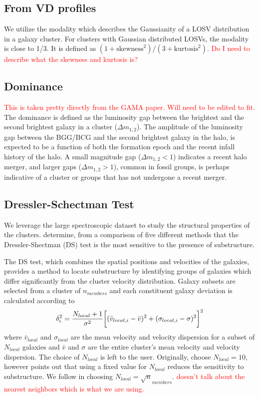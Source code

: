 \documentclass[apj, revtex4]{emulateapj}
\newcommand{\editorial}[1]{\textcolor{red}{#1} }
\begin{document}
\subsection{From VD profiles}
We utilize the modality \citep{Oliva-Altamirano2014} which describes the Gaussianity of a LOSV distribution in a galaxy cluster. For clusters with Gaussian distributed LOSVs, the modality is close to 1/3. It is defined as $(1+\mathrm{skewness}^2)/(3+\mathrm{kurtosis}^2)$. \editorial{Do I need to describe what the skewness and kurtosis is?}

\subsection{Dominance}
\editorial{This is taken pretty directly from the GAMA paper. Will need to be edited to fit.}
The dominance is defined as the luminosity gap between the brightest and the second brightest galaxy in a cluster ($\Delta m_{1, 2}$). The amplitude of the luminosity gap between the BGG/BCG and the second brightest galaxy in the halo, is expected to be a function of both the formation epoch and the recent infall history of the halo. A small magnitude gap ($\Delta m_{1, 2} < 1$) indicates a recent halo merger, and larger gaps ($\Delta m_{1, 2} > 1$), common in fossil groups, is perhaps indicative of a cluster or groups that has not undergone a recent merger.

\subsection{Dressler-Schectman Test}
We leverage the large spectroscopic dataset to study the structural properties of the clusters. \cite{Pinkney1996} determine, from a comparison of five different methods that the Dressler-Shectman (DS) test \citep{Dressler1988} is the most sensitive to the presence of substructure.

The DS test, which combines the spatial positions and velocities of the galaxies, provides a method to locate substructure by identifying groups of galaxies which differ significantly from the cluster velocity distribution. Galaxy subsets are selected from a cluster of $n_{members}$ and each constituent galaxy deviation is calculated according to
\begin{equation}
	\delta_i^2 = \frac{N_{local}+1}{\sigma^2}\bigg{[}(\bar{v}_{local,i} - \bar{v})^2 + (\sigma_{local,i} - \sigma)^2\bigg{]}^2
\end{equation}
where $\bar{v}_{local}$ and $\sigma_{local}$ are the mean velocity and velocity dispersion for a subset of $N_{local}$ galaxies and $\bar{v}$ and $\sigma$ are the entire cluster's mean velocity and velocity dispersion. The choice of $N_{local}$ is left to the user. Originally, \cite{Dressler1988} choose $N_{local}=10$, however \cite{Bird1994} points out that using a fixed value for $N_{local}$ reduces the sensitivity to substructure. We follow \cite{Bird1994} in choosing $N_{local} = \sqrt n_{members}$. \editorial{doesn't talk about the nearest neighbors which is what we are using.}
\end{document}
